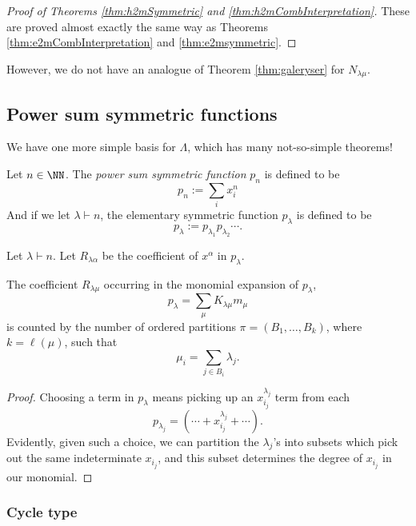 \documentclass{article}
\begin{document}
\begin{proof}[Proof of Theorems \ref{thm:h2mSymmetric} and \ref{thm:h2mCombInterpretation}]
    These are proved almost exactly the same way as Theorems \ref{thm:e2mCombInterpretation} and \ref{thm:e2msymmetric}.
\end{proof}

However, we do not have an analogue of Theorem \ref{thm:galeryser} for $N_{\lambda\mu}$.
\subsection{Power sum symmetric functions}

We have one more simple basis for $\Lambda$, which has many not-so-simple theorems!

\begin{definition}
    Let $n\in\NN$. The \textit{power sum symmetric function} $p_n$ is defined to be
    \[
        p_n := \sum_{i} x_i^n
    \]
    And if we let $\lambda \vdash n$, the elementary symmetric function $p_\lambda$ is defined to be
    \[
        p_\lambda := p_{\lambda_1}p_{\lambda_2}\cdots.
    \]
\end{definition}

\begin{definition}
    Let $\lambda \vdash n$. Let $R_{\lambda\alpha}$ be the coefficient of $x^\alpha$ in $p_\lambda$.
\end{definition}

\begin{theorem}
    The coefficient $R_{\lambda\mu}$ occurring in the monomial expansion of $p_\lambda$,
    \[
        p_\lambda = \sum_\mu K_{\lambda\mu} m_\mu
    \]
    is counted by the number of ordered partitions $\pi = (B_1, \ldots, B_k)$, where $k = \ell(\mu)$, such that
    \[
        \mu_i = \sum_{j\in B_i} \lambda_j.
    \]
\end{theorem}

\begin{proof}
    Choosing a term in $p_\lambda$ means picking up an $x_{i_j}^{\lambda_j}$ term from each
    \[
        p_{\lambda_j} = (\cdots + x_{i_j}^{\lambda_j} + \cdots).
    \]
    Evidently, given such a choice, we can partition the $\lambda_j$'s into subsets which pick out the same indeterminate $x_{i_j}$, and this subset determines the degree of $x_{i_j}$ in our monomial.
\end{proof}

\subsubsection{Cycle type}
\end{document}
